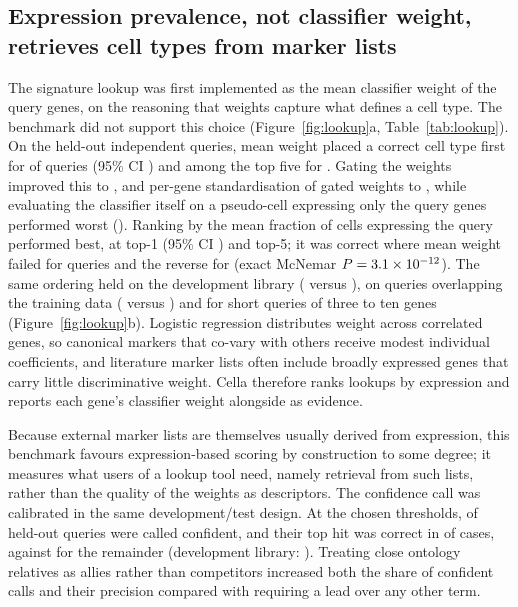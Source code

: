 \documentclass[11pt]{article}
\newcommand{\cella}{Cella}
\begin{document}
\subsection{Expression prevalence, not classifier weight, retrieves cell types from marker lists}

The signature lookup was first implemented as the mean classifier weight of the query genes, on the reasoning that weights capture what defines a cell type. The benchmark did not support this choice (Figure~\ref{fig:lookup}a, Table~\ref{tab:lookup}). On the \lkTest{} held-out independent queries, mean weight placed a correct cell type first for \lkWmeanTopOne{} of queries (95\% CI \lkWmeanTopOneCI{}) and among the top five for \lkWmeanTopFive{}. Gating the weights improved this to \lkWgatedTopOne{}, and per-gene standardisation of gated weights to \lkWgenezTopOne{}, while evaluating the classifier itself on a pseudo-cell expressing only the query genes performed worst (\lkPseudoTopOne{}). Ranking by the mean fraction of cells expressing the query performed best, at \lkExprTopOne{} top-1 (95\% CI \lkExprTopOneCI{}) and \lkExprTopFive{} top-5; it was correct where mean weight failed for \lkDisc{} queries and the reverse for \lkDiscRev{} (exact McNemar $P = 3.1\times10^{-12}{}$). The same ordering held on the development library (\lkDevExprTopOne{} versus \lkDevWmeanTopOne{}), on queries overlapping the training data (\lkOvExprTopOne{} versus \lkOvWmeanTopOne{}) and for short queries of three to ten genes (Figure~\ref{fig:lookup}b). Logistic regression distributes weight across correlated genes, so canonical markers that co-vary with others receive modest individual coefficients, and literature marker lists often include broadly expressed genes that carry little discriminative weight. \cella{} therefore ranks lookups by expression and reports each gene's classifier weight alongside as evidence.

Because external marker lists are themselves usually derived from expression, this benchmark favours expression-based scoring by construction to some degree; it measures what users of a lookup tool need, namely retrieval from such lists, rather than the quality of the weights as descriptors. The confidence call was calibrated in the same development/test design. At the chosen thresholds, \calConfFrac{} of held-out queries were called confident, and their top hit was correct in \calPrecConf{} of cases, against \calPrecRest{} for the remainder (development library: \calDevPrecConf{}). Treating close ontology relatives as allies rather than competitors increased both the share of confident calls and their precision compared with requiring a lead over any other term.
\end{document}
